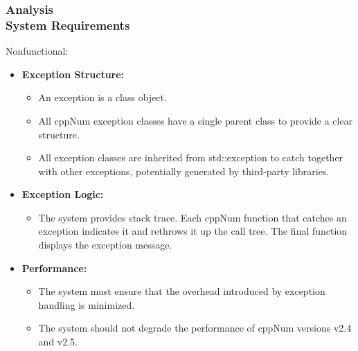 \documentclass[ucs,10pt]{beamer}
\begin{document}
\begin{frame}
\frametitle{Analysis \\
	\small \color{rwth-blue} System Requirements}
	Nonfunctional:
	\begin{itemize}
		\item \textbf{Exception Structure:}
		\begin{itemize}
			\item An exception is a class object.
			\item All cppNum exception classes have a single parent class to provide a clear structure.
			\item All exception classes are inherited from std::exception to catch together with other exceptions, potentially generated by third-party libraries.
		\end{itemize}
		\item \textbf{Exception Logic:}
		\begin{itemize}
			\item  The system provides stack trace. Each cppNum function that catches an exception indicates it and rethrows it up the call tree. The final function displays the exception message.  
		\end{itemize}
		\item \textbf{Performance:}
		\begin{itemize}
			\item The system must ensure that the overhead introduced by exception handling is minimized.
			\item The system should not degrade the performance of cppNum versions v2.4 and v2.5.
		\end{itemize}
        \end{itemize}
\end{frame}
\end{document}
